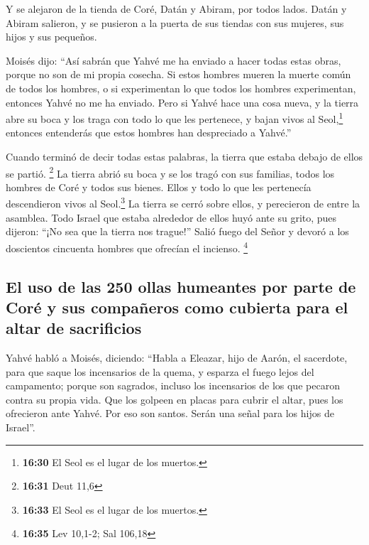  Y se alejaron de la tienda de Coré, Datán y Abiram, por
todos lados. Datán y Abiram salieron, y se pusieron a la puerta de sus
tiendas con sus mujeres, sus hijos y sus pequeños.

 Moisés dijo: ``Así sabrán que Yahvé me ha enviado a
hacer todas estas obras, porque no son de mi propia cosecha.
 Si estos hombres mueren la muerte común de todos los
hombres, o si experimentan lo que todos los hombres experimentan,
entonces Yahvé no me ha enviado.  Pero si Yahvé hace una
cosa nueva, y la tierra abre su boca y los traga con todo lo que les
pertenece, y bajan vivos al Seol,\footnote{\textbf{16:30} El Seol es el
  lugar de los muertos.} entonces entenderás que estos hombres han
despreciado a Yahvé.''

 Cuando terminó de decir todas estas palabras, la tierra
que estaba debajo de ellos se partió. \footnote{\textbf{16:31} Deut 11,6}
 La tierra abrió su boca y se los tragó con sus familias,
todos los hombres de Coré y todos sus bienes.  Ellos y
todo lo que les pertenecía descendieron vivos al Seol.\footnote{\textbf{16:33}
  El Seol es el lugar de los muertos.} La tierra se cerró sobre ellos, y
perecieron de entre la asamblea.  Todo Israel que estaba
alrededor de ellos huyó ante su grito, pues dijeron: ``¡No sea que la
tierra nos trague!''  Salió fuego del Señor y devoró a
los doscientos cincuenta hombres que ofrecían el incienso. \footnote{\textbf{16:35}
  Lev 10,1-2; Sal 106,18}

\hypertarget{el-uso-de-las-250-ollas-humeantes-por-parte-de-coruxe9-y-sus-compauxf1eros-como-cubierta-para-el-altar-de-sacrificios}{%
\subsection{El uso de las 250 ollas humeantes por parte de Coré y sus
compañeros como cubierta para el altar de
sacrificios}\label{el-uso-de-las-250-ollas-humeantes-por-parte-de-coruxe9-y-sus-compauxf1eros-como-cubierta-para-el-altar-de-sacrificios}}

 Yahvé habló a Moisés, diciendo:  ``Habla
a Eleazar, hijo de Aarón, el sacerdote, para que saque los incensarios
de la quema, y esparza el fuego lejos del campamento; porque son
sagrados,  incluso los incensarios de los que pecaron
contra su propia vida. Que los golpeen en placas para cubrir el altar,
pues los ofrecieron ante Yahvé. Por eso son santos. Serán una señal para
los hijos de Israel''.

